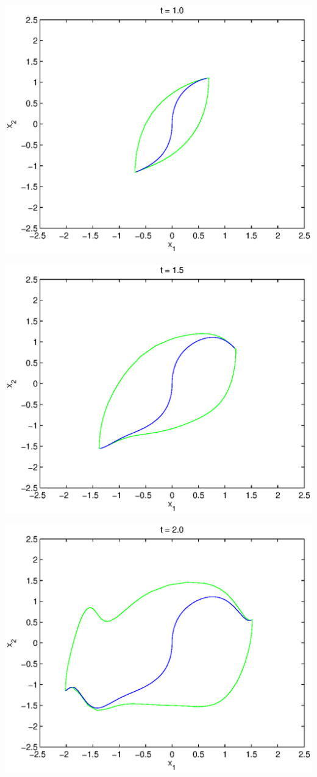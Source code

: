 \documentclass[11pt]{article}
\begin{document}
\begin{enumerate}
\includegraphics[scale=1.0]{pics/a2t1.eps}

\includegraphics[scale=1.0]{pics/a2t1.5.eps}

\includegraphics[scale=1.0]{pics/a2t2.eps}

\end{enumerate}
\end{document}
